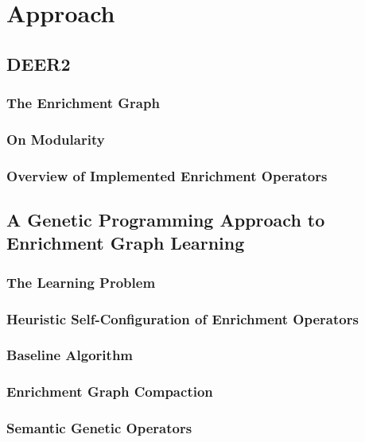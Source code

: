 \chapter{Approach}
\label{ch:approach}

\section{\acl{DEER2}}
\label{sec:deer2}

\subsection{The Enrichment Graph}
\label{ssec:enrichmentgraph}

\subsection{On Modularity}
\label{ssec:modularity}

\subsection{Overview of Implemented Enrichment Operators}
\label{ssec:enrichmentgraph}

\section{A Genetic Programming Approach to Enrichment Graph Learning}
\label{sec:gpapproach}

\subsection{The Learning Problem}
\label{ssec:learningproblem}

\subsection{Heuristic Self-Configuration of Enrichment Operators}
\label{ssec:selfconfig}

\subsection{Baseline Algorithm}
\label{ssec:baseline}

\subsection{Enrichment Graph Compaction}
\label{ssec:compaction}

\subsection{Semantic Genetic Operators}
\label{ssec:sgoapproach}